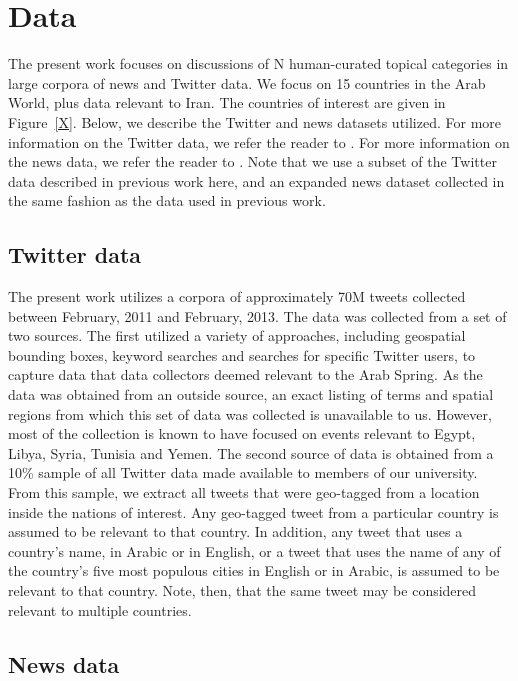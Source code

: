\section{Data}

The present work focuses on discussions of  N human-curated topical categories in large corpora of news and Twitter data.  We focus on 15 countries in the Arab World, plus data relevant to Iran.  The countries of interest are given in Figure~\ref{X}. Below, we describe the Twitter and news datasets utilized.  For more information on the Twitter data, we refer the reader to \cite{}.  For more information on the news data, we refer the reader to \cite{}.  Note that we use a subset of the Twitter data described in previous work here, and an expanded news dataset collected in the same fashion as the data used in previous work.

\subsection{Twitter data}

The present work utilizes a corpora of approximately 70M tweets collected between February, 2011 and February, 2013.  The data was collected from a set of two sources. The first utilized a variety of approaches, including geospatial bounding boxes, keyword searches and searches for specific Twitter users, to capture data that data collectors deemed relevant to the Arab Spring.  As the data was obtained from an outside source, an exact listing of terms and spatial regions from which this set of data was collected is unavailable to us.  However, most of the collection is known to have focused on events relevant to Egypt, Libya, Syria, Tunisia and Yemen.  The second source of data is obtained from a 10\% sample of all Twitter data made available to members of our university.  From this sample, we extract all tweets that were geo-tagged from a location inside the nations of interest. Any geo-tagged tweet from a particular country is assumed to be relevant to that country.  In addition, any tweet that uses a country's name, in Arabic or in English, or a tweet that uses the name of any of the country's five most populous cities in English or in Arabic, is assumed to be relevant to that country.  Note, then, that the same tweet may be considered relevant to multiple countries.  

\subsection{News data}

